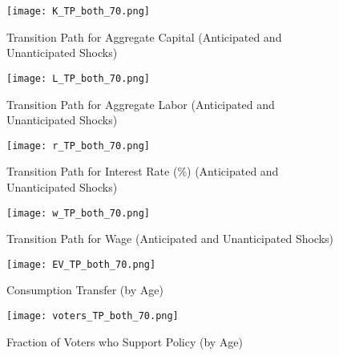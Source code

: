 \documentclass[12pt]{article}
\begin{document}
\begin{figure}[!htbp]
    \centering
    \texttt{[image: K\_TP\_both\_70.png]}
    \caption{Transition Path for Aggregate Capital (Anticipated and Unanticipated Shocks)}
    \label{fig:K}
\end{figure}

\begin{figure}[!htbp]
    \centering
    \texttt{[image: L\_TP\_both\_70.png]}
    \caption{Transition Path for Aggregate Labor (Anticipated and Unanticipated Shocks)}
    \label{fig:L}
\end{figure}

\begin{figure}[!htbp]
    \centering
    \texttt{[image: r\_TP\_both\_70.png]}
    \caption{Transition Path for Interest Rate (\%) (Anticipated and Unanticipated Shocks)}
    \label{fig:r}
\end{figure}

\begin{figure}[!htbp]
    \centering
    \texttt{[image: w\_TP\_both\_70.png]}
    \caption{Transition Path for Wage (Anticipated and Unanticipated Shocks)}
    \label{fig:w}
\end{figure}

\clearpage

\begin{figure}[!htbp]
    \centering
    \texttt{[image: EV\_TP\_both\_70.png]}
    \caption{Consumption Transfer (by Age)}
    \label{fig:EV}
\end{figure}

\begin{figure}[!htbp]
    \centering
    \texttt{[image: voters\_TP\_both\_70.png]}
    \caption{Fraction of Voters who Support Policy (by Age) }
    \label{fig:EV}
\end{figure}
\end{document}
